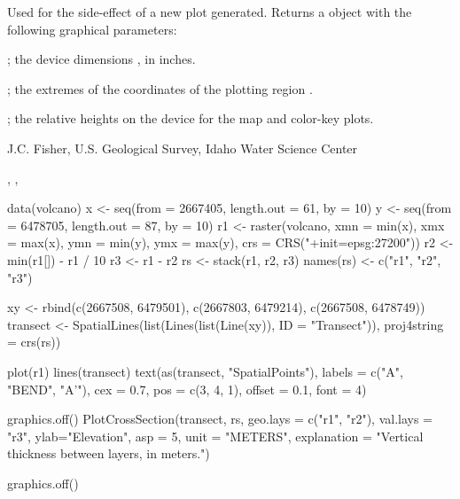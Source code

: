 \documentclass[a4paper]{book}
\begin{document}
%
\begin{Value}
Used for the side-effect of a new plot generated.
Returns a  object with the following graphical parameters:
\begin{ldescription}
\item[\code{din}] ; the device dimensions , in inches.
\item[\code{usr}] ; the extremes of the coordinates of the plotting region .
\item[\code{heights}] ; the relative heights on the device  for the map and color-key plots.
\end{ldescription}
\end{Value}
%
\begin{Author}\relax
J.C. Fisher, U.S. Geological Survey, Idaho Water Science Center
\end{Author}
%
\begin{SeeAlso}\relax
{}, , 
\end{SeeAlso}
%
\begin{Examples}
\begin{ExampleCode}
data(volcano)
x <- seq(from = 2667405, length.out = 61, by = 10)
y <- seq(from = 6478705, length.out = 87, by = 10)
r1 <- raster(volcano, xmn = min(x), xmx = max(x), ymn = min(y), ymx = max(y),
             crs = CRS("+init=epsg:27200"))
r2 <- min(r1[]) - r1 / 10
r3 <- r1 - r2
rs <- stack(r1, r2, r3)
names(rs) <- c("r1", "r2", "r3")

xy <- rbind(c(2667508, 6479501), c(2667803, 6479214), c(2667508, 6478749))
transect <- SpatialLines(list(Lines(list(Line(xy)), ID = "Transect")),
                         proj4string = crs(rs))

plot(r1)
lines(transect)
text(as(transect, "SpatialPoints"), labels = c("A", "BEND", "A'"), cex = 0.7,
     pos = c(3, 4, 1), offset = 0.1, font = 4)

graphics.off()
PlotCrossSection(transect, rs, geo.lays = c("r1", "r2"), val.lays = "r3",
                 ylab="Elevation", asp = 5, unit = "METERS",
                 explanation = "Vertical thickness between layers, in meters.")

graphics.off()
\end{ExampleCode}
\end{Examples}
\end{document}
